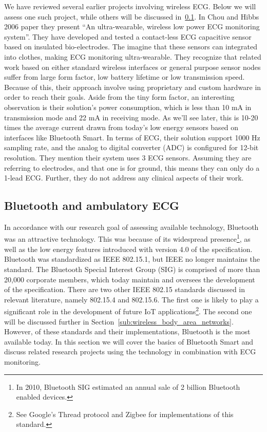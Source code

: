 We have reviewed several earlier projects involving wireless ECG. Below we will assess one such project, while others will be discussed in~\ref{sub:bluetooth}. In Chou and Hibbs 2006 paper \cite{ChulsungPark:2006tf} they present ``An ultra-wearable, wireless low power ECG monitoring system''. They have developed and tested a contact-less ECG capacitive sensor based on insulated bio-electrodes. The imagine that these sensors can integrated into clothes, making ECG monitoring ultra-wearable. They recognize that related work based on either standard wireless interfaces or general purpose sensor nodes suffer from large form factor, low battery lifetime or low transmission speed. Because of this, their approach involve using proprietary and custom hardware in order to reach their goals. Aside from the tiny form factor, an interesting observation is their solution's power consumption, which is less than 10 mA in transmission mode and 22 mA in receiving mode. As we'll see later, this is 10-20 times the average current drawn from today's low energy sensors based on interfaces like Bluetooth Smart. In terms of ECG, their solution support 1000 Hz sampling rate, and the analog to digital converter (ADC) is configured for 12-bit resolution. They mention their system uses 3 ECG sensors. Assuming they are referring to electrodes, and that one is for ground, this means they can only do a 1-lead ECG. Further, they do not address any clinical aspects of their work.


\subsection{Bluetooth and ambulatory ECG} %
\label{sub:bluetooth}

In accordance with our research goal of assessing available technology, Bluetooth was an attractive technology. This was because of its widespread presence\footnote{ In 2010, Bluetooth SIG estimated an annual sale of 2 billion Bluetooth enabled devices.}, as well as the low energy features introduced with version 4.0 of the specification. Bluetooth was standardized as IEEE 802.15.1, but IEEE no longer maintains the standard. The Bluetooth Special Interest Group (SIG) is comprised of more than 20,000 corporate members, which today maintain and oversees the development of the specification. There are two other IEEE 802.15 standards discussed in relevant literature, namely 802.15.4 and 802.15.6. The first one is likely to play a significant role in the development of future IoT applications\footnote{ See Google's Thread protocol and Zigbee for implementations of this standard.}. The second one will be discussed further in Section~\ref{sub:wireless_body_area_networks}. However, of these standards and their implementations, Bluetooth is the most available today. In this section we will cover the basics of Bluetooth Smart and discuss related research projects using the technology in combination with ECG monitoring.

